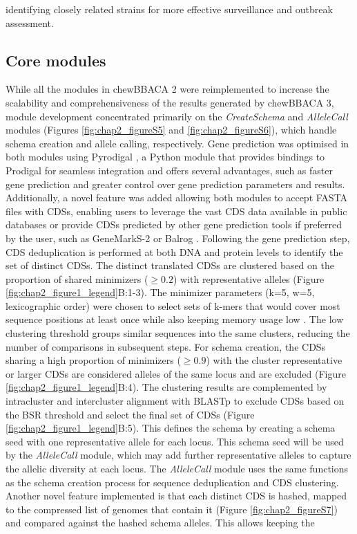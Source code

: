 identifying closely related strains for more effective surveillance and outbreak assessment.

\subsection{Core modules} \label{ssec:ch2_implementation_core_modules}

While all the modules in chewBBACA 2 were reimplemented to increase the scalability and comprehensiveness of the results generated by chewBBACA 3, module development concentrated primarily on the \textit{CreateSchema} and \textit{AlleleCall} modules (Figures \ref{fig:chap2_figureS5} and \ref{fig:chap2_figureS6}), which handle schema creation and allele calling, respectively. Gene prediction was optimised in both modules using Pyrodigal \citep{larralde_pyrodigal_2022, hyatt_prodigal_2010}, a Python module that provides bindings to Prodigal for seamless integration and offers several advantages, such as faster gene prediction and greater control over gene prediction parameters and results. Additionally, a novel feature was added allowing both modules to accept FASTA files with \acp{CDS}, enabling users to leverage the vast \ac{CDS} data available in public databases or provide \acp{CDS} predicted by other gene prediction tools if preferred by the user, such as GeneMarkS-2 or Balrog \citep{lomsadze_modeling_2018, sommer_balrog_2021}. Following the gene prediction step, \ac{CDS} deduplication is performed at both \ac{DNA} and protein levels to identify the set of distinct \acp{CDS}. The distinct translated \acp{CDS} are clustered based on the proportion of shared minimizers ($\geq0.2$) with representative alleles \citep{schleimer_winnowing_nodate, roberts_reducing_2004, marcais_improving_2017} (Figure \ref{fig:chap2_figure1_legend}B:1-3). The minimizer parameters (k=5, w=5, lexicographic order) were chosen to select sets of k-mers that would cover most sequence positions at least once while also keeping memory usage low \citep{zheng_improved_2020}. The low clustering threshold groups similar sequences into the same clusters, reducing the number of comparisons in subsequent steps. For schema creation, the \acp{CDS} sharing a high proportion of minimizers ($\geq0.9$) with the cluster representative or larger \acp{CDS} are considered alleles of the same locus and are excluded (Figure \ref{fig:chap2_figure1_legend}B:4). The clustering results are complemented by intracluster and intercluster alignment with \ac{BLASTp} to exclude \acp{CDS} based on the \ac{BSR} threshold and select the final set of \acp{CDS} (Figure \ref{fig:chap2_figure1_legend}B:5). This defines the schema by creating a schema seed with one representative allele for each locus. This schema seed will be used by the \textit{AlleleCall} module, which may add further representative alleles to capture the allelic diversity at each locus. The \textit{AlleleCall} module uses the same functions as the schema creation process for sequence deduplication and \ac{CDS} clustering. Another novel feature implemented is that each distinct \ac{CDS} is hashed, mapped to the compressed list of genomes that contain it (Figure \ref{fig:chap2_figureS7}) and compared against the hashed schema alleles. This allows keeping the 